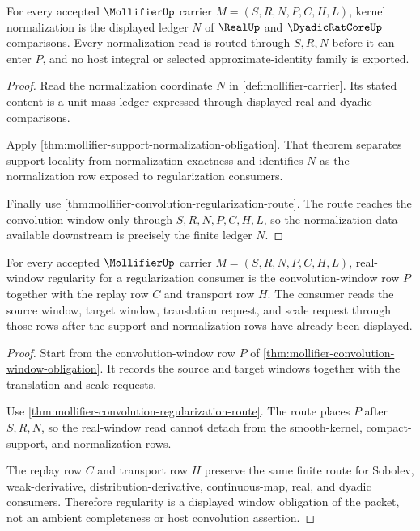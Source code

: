 \begin{theorem}
\label{thm:mollifier-dyadic-kernel-normalization}
For every accepted $\MollifierUp$ carrier $M=(S,R,N,P,C,H,L)$, kernel normalization is the displayed ledger $N$ of $\RealUp$ and $\DyadicRatCoreUp$ comparisons. Every normalization read is routed through $S,R,N$ before it can enter $P$, and no host integral or selected approximate-identity family is exported.
\end{theorem}
\begin{proof}
Read the normalization coordinate $N$ in \autoref{def:mollifier-carrier}. Its stated content is a unit-mass ledger expressed through displayed real and dyadic comparisons.

Apply \autoref{thm:mollifier-support-normalization-obligation}. That theorem separates support locality from normalization exactness and identifies $N$ as the normalization row exposed to regularization consumers.

Finally use \autoref{thm:mollifier-convolution-regularization-route}. The route reaches the convolution window only through $S,R,N,P,C,H,L$, so the normalization data available downstream is precisely the finite ledger $N$.
\end{proof}

\begin{theorem}
\label{thm:mollifier-real-window-regularity}
For every accepted $\MollifierUp$ carrier $M=(S,R,N,P,C,H,L)$, real-window regularity for a regularization consumer is the convolution-window row $P$ together with the replay row $C$ and transport row $H$. The consumer reads the source window, target window, translation request, and scale request through those rows after the support and normalization rows have already been displayed.
\end{theorem}
\begin{proof}
Start from the convolution-window row $P$ of \autoref{thm:mollifier-convolution-window-obligation}. It records the source and target windows together with the translation and scale requests.

Use \autoref{thm:mollifier-convolution-regularization-route}. The route places $P$ after $S,R,N$, so the real-window read cannot detach from the smooth-kernel, compact-support, and normalization rows.

The replay row $C$ and transport row $H$ preserve the same finite route for Sobolev, weak-derivative, distribution-derivative, continuous-map, real, and dyadic consumers. Therefore regularity is a displayed window obligation of the packet, not an ambient completeness or host convolution assertion.
\end{proof}

